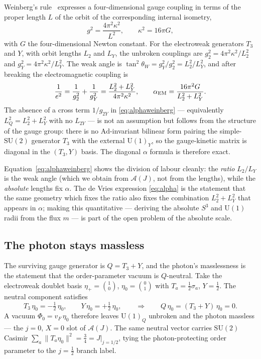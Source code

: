 \documentclass[11pt]{article}
\theoremstyle{plain}
\theoremstyle{definition}
\newcommand{\cA}{\mathcal{A}}
\newcommand{\half}{\tfrac12}
\newcommand{\SU}{\mathrm{SU}}
\newcommand{\U}{\mathrm{U}}
\begin{document}
Weinberg's rule~\cite{Weinberg1983} expresses a four-dimensional gauge
coupling in terms of the proper length $L$ of the orbit of the corresponding
internal isometry,
\begin{equation}
g^2=\frac{4\pi^2\kappa^2}{L^2},\qquad \kappa^2=16\pi G,
\end{equation}
with $G$ the four-dimensional Newton constant. For the electroweak
generators $T_3$ and $Y$, with orbit lengths $L_2$ and $L_Y$, the
unbroken couplings are $g_2^2=4\pi^2\kappa^2/L_2^2$ and
$g_Y^2=4\pi^2\kappa^2/L_Y^2$. The weak angle is
$\tan^2\theta_W=g_Y^2/g_2^2=L_2^2/L_Y^2$, and after breaking the
electromagnetic coupling is
\begin{equation}
\frac1{e^2}=\frac1{g_2^2}+\frac1{g_Y^2}
=\frac{L_2^2+L_Y^2}{4\pi^2\kappa^2},
\qquad
\alpha_{\rm EM}=\frac{16\pi^2 G}{L_2^2+L_Y^2}.
\label{eq:alphaweinberg}
\end{equation}
The absence of a cross term $1/g_{2Y}$ in \eqref{eq:alphaweinberg} ---
equivalently $L_Q^2=L_2^2+L_Y^2$ with no $L_{2Y}$ --- is not an assumption
but follows from the structure of the gauge group: there is no
$\mathrm{Ad}$-invariant bilinear form pairing the simple-$\SU(2)$ generator
$T_3$ with the external $\U(1)_Y$, so the gauge-kinetic matrix is diagonal in
the $(T_3,Y)$ basis. The diagonal $\alpha$ formula is therefore exact.

Equation~\eqref{eq:alphaweinberg} shows the division of labour cleanly: the
\emph{ratio} $L_2/L_Y$ is the weak angle (which we obtain from $\cA(J)$,
not from the lengths), while the \emph{absolute} lengths fix $\alpha$.
The de Vries expression \eqref{eq:alpha} is the statement that the same
geometry which fixes the ratio also fixes the combination
$L_2^2+L_Y^2$ that appears in $\alpha$; making this quantitative ---
deriving the absolute $S^3$ and $\U(1)$ radii from the flux $m$ --- is part
of the open problem of the absolute scale.

\subsection{The photon stays massless}

The surviving gauge generator is $Q=T_3+Y$, and the photon's masslessness
is the statement that the order-parameter vacuum is $Q$-neutral. Take the
electroweak doublet basis $\eta_+=\binom10$, $\eta_0=\binom01$ with
$T_a=\tfrac12\sigma_a$, $Y=\tfrac12$. The neutral component satisfies
\begin{equation}
T_3\,\eta_0=-\tfrac12\,\eta_0,\qquad Y\,\eta_0=+\tfrac12\,\eta_0,
\qquad\Longrightarrow\qquad
Q\,\eta_0=(T_3+Y)\,\eta_0=0 .
\label{eq:photon}
\end{equation}
A vacuum $\Phi_0=v_F\,\eta_0$ therefore leaves $\U(1)_Q$ unbroken and the
photon massless --- the $j=0$, $X=0$ slot of $\cA(J)$. The same neutral
vector carries $\SU(2)$ Casimir
$\sum_a\|T_a\eta_0\|^2=\tfrac34=J|_{j=1/2}$, tying the photon-protecting
order parameter to the $j=\half$ branch label.
\end{document}
